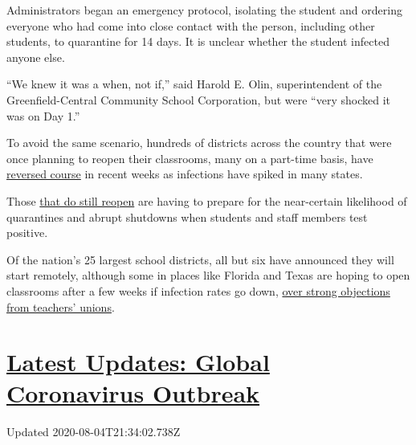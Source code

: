 Administrators began an emergency protocol, isolating the student and
ordering everyone who had come into close contact with the person,
including other students, to quarantine for 14 days. It is unclear
whether the student infected anyone else.

``We knew it was a when, not if,'' said Harold E. Olin, superintendent
of the Greenfield-Central Community School Corporation, but were ``very
shocked it was on Day 1.''

To avoid the same scenario, hundreds of districts across the country
that were once planning to reopen their classrooms, many on a part-time
basis, have
\href{https://www.nytimes3xbfgragh.onion/2020/07/13/us/lausd-san-diego-school-reopening.html}{reversed
course} in recent weeks as infections have spiked in many states.

Those
\href{https://www.nytimes3xbfgragh.onion/2020/07/14/us/coronavirus-schools-fall.html}{that
do still reopen} are having to prepare for the near-certain likelihood
of quarantines and abrupt shutdowns when students and staff members test
positive.

Of the nation's 25 largest school districts, all but six have announced
they will start remotely, although some in places like Florida and Texas
are hoping to open classrooms after a few weeks if infection rates go
down,
\href{https://www.nytimes3xbfgragh.onion/2020/07/29/us/teacher-union-school-reopening-coronavirus.html}{over
strong objections from teachers' unions}.

\hypertarget{latest-updates-global-coronavirus-outbreak}{%
\section{\texorpdfstring{\href{https://www.nytimes3xbfgragh.onion/2020/08/04/world/coronavirus-cases.html?action=click\&pgtype=Article\&state=default\&region=MAIN_CONTENT_1\&context=storylines_live_updates}{Latest
Updates: Global Coronavirus
Outbreak}}{Latest Updates: Global Coronavirus Outbreak}}\label{latest-updates-global-coronavirus-outbreak}}

Updated 2020-08-04T21:34:02.738Z

